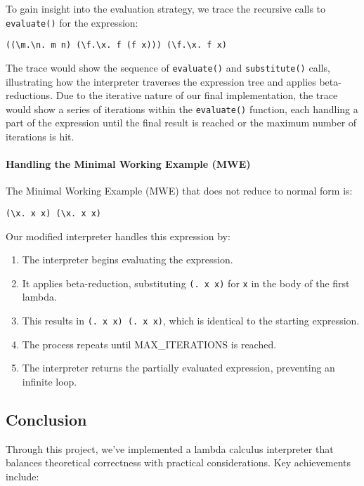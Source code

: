 To gain insight into the evaluation strategy, we trace the recursive calls to \texttt{evaluate()} for the expression:

\begin{verbatim}
((\m.\n. m n) (\f.\x. f (f x))) (\f.\x. f x)
\end{verbatim}

The trace would show the sequence of \texttt{evaluate()} and \texttt{substitute()} calls, illustrating how the interpreter traverses the expression tree and applies beta-reductions. Due to the iterative nature of our final implementation, the trace would show a series of iterations within the \texttt{evaluate()} function, each handling a part of the expression until the final result is reached or the maximum number of iterations is hit.

\paragraph{Handling the Minimal Working Example (MWE)}

The Minimal Working Example (MWE) that does not reduce to normal form is:

\begin{verbatim}
(\x. x x) (\x. x x)
\end{verbatim}

Our modified interpreter handles this expression by:

\begin{enumerate}
    \item The interpreter begins evaluating the expression.
    \item It applies beta-reduction, substituting \texttt{(\x. x x)} for \texttt{x} in the body of the first lambda.
    \item This results in \texttt{(\x. x x) (\x. x x)}, which is identical to the starting expression.
    \item The process repeats until MAX\_ITERATIONS is reached.
    \item The interpreter returns the partially evaluated expression, preventing an infinite loop.
\end{enumerate}

\subsection{Conclusion}

Through this project, we've implemented a lambda calculus interpreter that balances theoretical correctness with practical considerations. Key achievements include:

